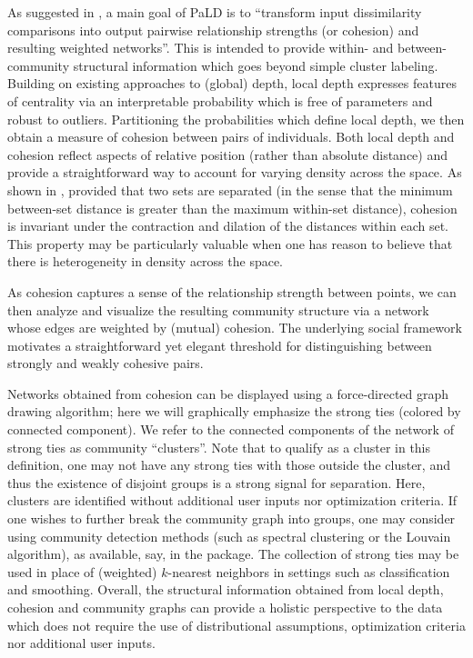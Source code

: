 As suggested in \citet{berenhaut2022social}, a main goal of PaLD is to ``transform input dissimilarity comparisons into output pairwise relationship strengths (or cohesion) and resulting weighted networks''. This is intended to provide within- and between-community structural information which goes beyond simple cluster labeling. Building on existing approaches to (global) depth, local depth expresses features of centrality via an interpretable probability which is free of parameters and robust to outliers. Partitioning the probabilities which define local depth, we then obtain a measure of cohesion between pairs of individuals. Both local depth and cohesion reflect aspects of relative position (rather than absolute distance) and provide a straightforward
way to account for varying density across the space. As shown in \citet{berenhaut2022social}, provided that two sets are separated (in the sense that the minimum between-set distance is greater than the maximum within-set distance), cohesion is invariant under the contraction and dilation of the distances within each set. This property may be particularly valuable when one has reason to believe that there is heterogeneity in density across the space.

As cohesion captures a sense of the relationship strength between points, we can then analyze and visualize the resulting community structure via a network whose edges are weighted by (mutual) cohesion. The underlying social framework motivates a straightforward yet elegant threshold for distinguishing between strongly and weakly cohesive pairs.

Networks obtained from
cohesion can be displayed using a force-directed graph drawing algorithm; here we will graphically emphasize
the strong ties (colored by connected component). We refer to the
connected components of the network of strong ties as community
``clusters''. Note that to qualify as a cluster in this definition, one
may not have any strong ties with those outside the cluster, and thus
the existence of disjoint groups is a strong signal for separation.
Here, clusters are identified without additional user inputs nor
optimization criteria. If one wishes to further break the community
graph into groups, one may consider using community detection methods
(such as spectral clustering or the Louvain algorithm), as available,
say, in the  package. The collection of strong ties may be used in place of
(weighted) \(k\)-nearest neighbors in settings such as classification and
smoothing. Overall, the structural information obtained from local
depth, cohesion and community graphs can provide a holistic perspective
to the data which does not require the use of distributional
assumptions, optimization criteria nor additional user inputs.


